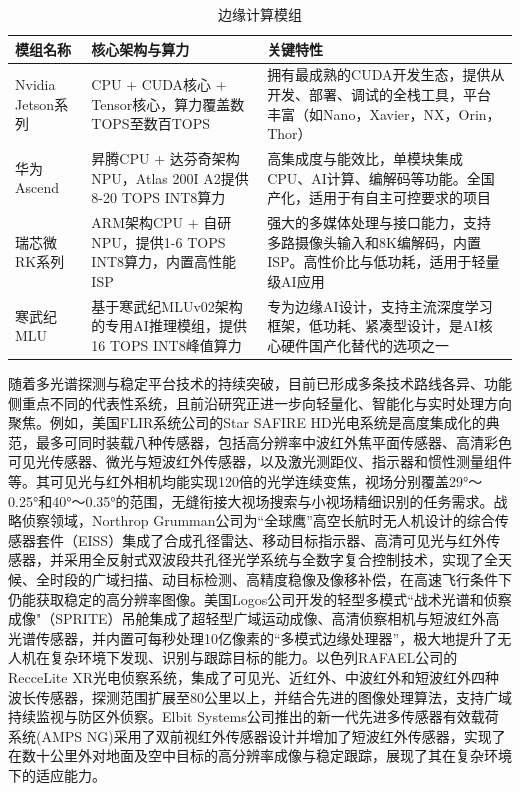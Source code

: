 \begin{table}[htbp]
\caption{边缘计算模组}
\centering
{
    
    \linespread{1.5}\selectfont
    \renewcommand{\arraystretch}{1.5}
    \begin{tabularx}{\textwidth}{p{2.8cm}XX}
    \toprule
    \textbf{模组名称} & \textbf{核心架构与算力} & \textbf{关键特性} \\ \midrule
    Nvidia Jetson系列 & CPU + CUDA核心 + Tensor核心，算力覆盖数TOPS至数百TOPS & 拥有最成熟的CUDA开发生态，提供从开发、部署、调试的全栈工具，平台丰富（如Nano，Xavier，NX，Orin，Thor） \\
    华为Ascend & 昇腾CPU + 达芬奇架构NPU，Atlas 200I A2提供8-20 TOPS INT8算力 & 高集成度与能效比，单模块集成CPU、AI计算、编解码等功能。全国产化，适用于有自主可控要求的项目 \\
    瑞芯微RK系列 & ARM架构CPU + 自研NPU，提供1-6 TOPS INT8算力，内置高性能ISP & 强大的多媒体处理与接口能力，支持多路摄像头输入和8K编解码，内置ISP。高性价比与低功耗，适用于轻量级AI应用 \\
    寒武纪MLU & 基于寒武纪MLUv02架构的专用AI推理模组，提供16 TOPS INT8峰值算力 & 专为边缘AI设计，支持主流深度学习框架，低功耗、紧凑型设计，是AI核心硬件国产化替代的选项之一 \\
    \bottomrule
    \end{tabularx}
}
\label{edge-device}
\end{table}

随着多光谱探测与稳定平台技术的持续突破，目前已形成多条技术路线各异、功能侧重点不同的代表性系统，且前沿研究正进一步向轻量化、智能化与实时处理方向聚焦。例如，美国FLIR系统公司的Star SAFIRE HD光电系统是高度集成化的典范，最多可同时装载八种传感器，包括高分辨率中波红外焦平面传感器、高清彩色可见光传感器、微光与短波红外传感器，以及激光测距仪、指示器和惯性测量组件等。其可见光与红外相机均能实现120倍的光学连续变焦，视场分别覆盖29°～0.25°和40°～0.35°的范围，无缝衔接大视场搜索与小视场精细识别的任务需求。战略侦察领域，Northrop Grumman公司为“全球鹰”高空长航时无人机设计的综合传感器套件（EISS）集成了合成孔径雷达、移动目标指示器、高清可见光与红外传感器，并采用全反射式双波段共孔径光学系统与全数字复合控制技术，实现了全天候、全时段的广域扫描、动目标检测、高精度稳像及像移补偿，在高速飞行条件下仍能获取稳定的高分辨率图像。美国Logos公司开发的轻型多模式“战术光谱和侦察成像"（SPRITE）吊舱集成了超轻型广域运动成像、高清侦察相机与短波红外高光谱传感器，并内置可每秒处理10亿像素的“多模式边缘处理器”，极大地提升了无人机在复杂环境下发现、识别与跟踪目标的能力。以色列RAFAEL公司的RecceLite XR光电侦察系统，集成了可见光、近红外、中波红外和短波红外四种波长传感器，探测范围扩展至80公里以上，并结合先进的图像处理算法，支持广域持续监视与防区外侦察。Elbit Systems公司推出的新一代先进多传感器有效载荷系统(AMPS NG)采用了双前视红外传感器设计并增加了短波红外传感器，实现了在数十公里外对地面及空中目标的高分辨率成像与稳定跟踪，展现了其在复杂环境下的适应能力。

